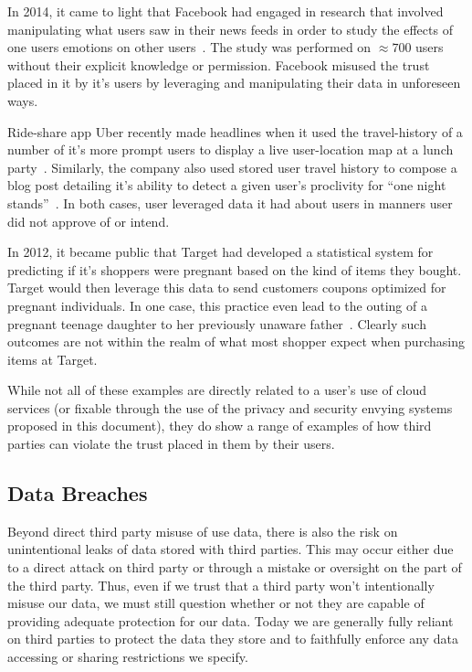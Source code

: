 \begin{packed_desc}
\item[Facebook Emotional Contagion Study:] In 2014, it came to light
  that Facebook had engaged in research that involved manipulating
  what users saw in their news feeds in order to study the effects of
  one users emotions on other users~\cite{goel2014}. The study was
  performed on $\approx700$ users without their explicit knowledge or
  permission. Facebook misused the trust placed in it by it's users by
  leveraging and manipulating their data in unforeseen ways.
\item[Uber User Travel History:] Ride-share app Uber recently made
  headlines when it used the travel-history of a number of it's more
  prompt users to display a live user-location map at a lunch
  party~\cite{sims2014}. Similarly, the company also used stored user
  travel history to compose a blog post detailing it's ability to
  detect a given user's proclivity for ``one night
  stands''~\cite{pagliery2014}. In both cases, user leveraged data it
  had about users in manners user did not approve of or intend.
\item[Target Pregnancy Prediction:] In 2012, it became public that
  Target had developed a statistical system for predicting if it's
  shoppers were pregnant based on the kind of items they
  bought. Target would then leverage this data to send customers
  coupons optimized for pregnant individuals. In one case, this
  practice even lead to the outing of a pregnant teenage daughter to
  her previously unaware father~\cite{hill2012}. Clearly such outcomes
  are not within the realm of what most shopper expect when purchasing
  items at Target.
\end{packed_desc}

While not all of these examples are directly related to a user's use
of cloud services (or fixable through the use of the privacy and
security envying systems proposed in this document), they do show a
range of examples of how third parties can violate the trust placed in
them by their users.

\subsection{Data Breaches}

Beyond direct third party misuse of use data, there is also the risk
on unintentional leaks of data stored with third parties. This may
occur either due to a direct attack on third party or through a
mistake or oversight on the part of the third party. Thus, even if we
trust that a third party won't intentionally misuse our data, we must
still question whether or not they are capable of providing adequate
protection for our data. Today we are generally fully reliant on third
parties to protect the data they store and to faithfully enforce any
data accessing or sharing restrictions we specify.

